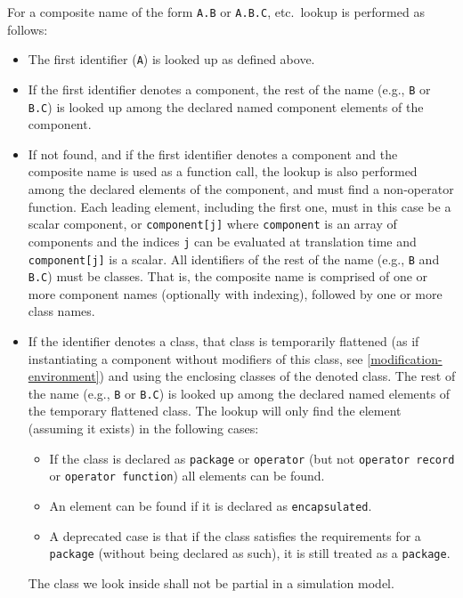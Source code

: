 For a composite name of the form \lstinline!A.B! or \lstinline!A.B.C!, etc.\ lookup is performed as follows:
\begin{itemize}
\item
  The first identifier (\lstinline!A!) is looked up as defined above.
\item
  If the first identifier denotes a component, the rest of the name (e.g., \lstinline!B! or \lstinline!B.C!) is looked up among the declared named component elements of the component.
\item
  If not found, and if the first identifier denotes a component and the composite name is used as a function call, the lookup is also performed among the declared elements of the component, and must find a non-operator function.
  Each leading element, including the first one, must in this case be a scalar component, or \lstinline!component[j]! where \lstinline!component! is an array of components and the indices \lstinline!j! can be evaluated at translation time and \lstinline!component[j]! is a scalar.
  All identifiers of the rest of the name (e.g., \lstinline!B! and \lstinline!B.C!) must be classes.
  That is, the composite name is comprised of one or more component names (optionally with indexing), followed by one or more class names.
\item
  If the identifier denotes a class, that class is temporarily flattened (as if instantiating a component without modifiers of this class, see \cref{modification-environment}) and using the enclosing classes of the denoted class.
  The rest of the name (e.g., \lstinline!B! or \lstinline!B.C!) is looked up among the declared named elements of the temporary flattened class.
  The lookup will only find the element (assuming it exists) in the following cases:
  \begin{itemize}
  \item If the class is declared as \lstinline!package! or \lstinline!operator! (but not \lstinline!operator record! or \lstinline!operator function!) all elements can be found.
  \item An element can be found if it is declared as \lstinline!encapsulated!.
  \item A deprecated case is that if the class satisfies the requirements for a \lstinline!package! (without being declared as such), it is still treated as a \lstinline!package!.
  \end{itemize}
  The class we look inside shall not be partial in a simulation model.
\end{itemize}

